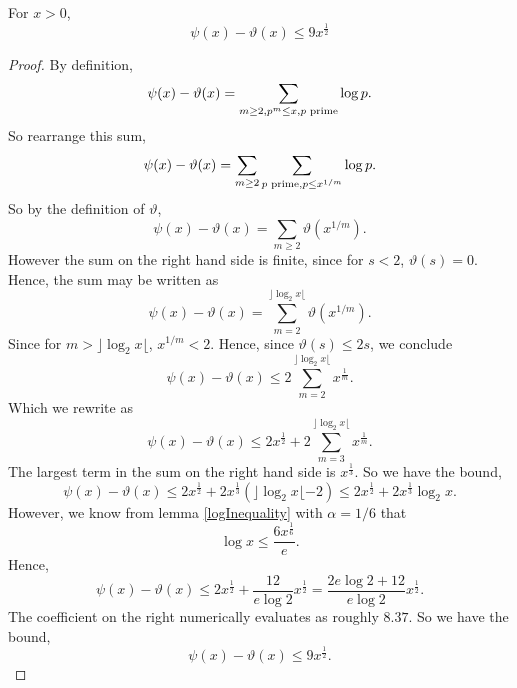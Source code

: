 \documentclass{unswmaths}
\begin{document}
\begin{theorem}
    For $x > 0$,
    \begin{equation*}
        \psi(x)-\vartheta(x) \leq 9x^{\frac{1}{2}}
    \end{equation*}
\end{theorem}
\begin{proof}
    By definition,
    \begin{equation*}
        \psi(x)-\vartheta(x) = \sum_{m\geq 2, p^m \leq x, {p\text{ prime}}} \log{p}.
    \end{equation*}
    So rearrange this sum,
    \begin{equation*}
        \psi(x)-\vartheta(x) = \sum_{m\geq 2} \sum_{{p\text{ prime}}, p\leq x^{1/m}} \log{p}.
    \end{equation*}
    So by the definition of $\vartheta$,
    \begin{equation*}
        \psi(x)-\vartheta(x) = \sum_{m\geq 2} \vartheta(x^{1/m}).
    \end{equation*}
    However the sum on the right hand side is finite, since for $s < 2$, $\vartheta(s) = 0$. Hence, the sum
    may be written as
    \begin{equation*}
        \psi(x) - \vartheta(x) = \sum_{m=2}^{\rfloor \log_2{x}\lfloor} \vartheta(x^{1/m}).
    \end{equation*}
    Since for $m > \rfloor \log_2{x} \lfloor$, $x^{1/m} < 2$. Hence, since $\vartheta(s) \leq 2s$, we conclude
    \begin{equation*}
        \psi(x) - \vartheta(x) \leq 2\sum_{m=2}^{\rfloor \log_2{x} \lfloor} x^{\frac{1}{m}}.
    \end{equation*}
    Which we rewrite as 
    \begin{equation*}
        \psi(x) - \vartheta(x) \leq 2x^{\frac{1}{2}} + 2\sum_{m=3}^{\rfloor \log_2{x} \lfloor} x^{\frac{1}{m}}.
    \end{equation*}
    The largest term in the sum on the right hand side is $x^{\frac{1}{3}}$. So we have the bound,
    \begin{equation*}
        \psi(x) - \vartheta(x) \leq 2x^{\frac{1}{2}}+2x^{\frac{1}{3}}(\rfloor \log_2{x} \lfloor - 2) \leq 2x^{\frac{1}{2}} + 2x^{\frac{1}{3}} \log_2{x}.
    \end{equation*}
    However, we know from lemma \ref{logInequality} with $\alpha = 1/6$ that
    \begin{equation*}
        \log{x} \leq \frac{6x^{\frac{1}{6}}}{e}.
    \end{equation*}
    Hence,
    \begin{equation*}
        \psi(x) - \vartheta(x) \leq 2x^{\frac{1}{2}}+\frac{12}{e\log{2}}x^\frac{1}{2}  = \frac{2e\log{2}+12}{e\log{2}}x^\frac{1}{2}.
    \end{equation*}
    The coefficient on the right numerically evaluates as roughly $8.37$. So we have the bound,
    \begin{equation*}
        \psi(x) - \vartheta(x) \leq 9x^\frac{1}{2}.
    \end{equation*}
\end{proof}
\end{document}
